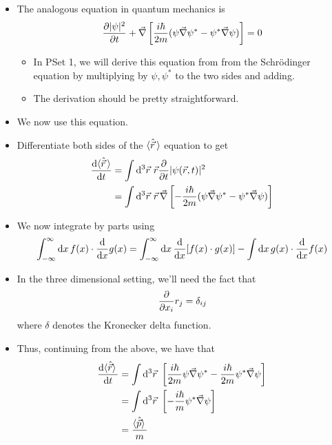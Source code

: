 \documentclass[../notes.tex]{subfiles}
\begin{document}
\begin{itemize}
\begin{itemize}
        \item The analogous equation in quantum mechanics is
        \begin{equation*}
            \pdv{|\psi|^2}{t}+\vec{\nabla}\left[ \frac{i\hbar}{2m}(\psi\vec{\nabla}\psi^*-\psi^*\vec{\nabla}\psi) \right] = 0
        \end{equation*}
        \begin{itemize}
            \item In PSet 1, we will derive this equation from from the Schr\"{o}dinger equation by multiplying by $\psi,\psi^*$ to the two sides and adding.
            \item The derivation should be pretty straightforward.
        \end{itemize}
        \item We now use this equation.
        \item Differentiate both sides of the $\langle{\hat{\vec{r}}\,}\rangle$ equation to get
        \begin{align*}
            \dv{\Exp{\hat{\vec{r}}\,}}{t} &= \int\dd^3\vec{r}\ \vec{r}\pdv{t}|\psi(\vec{r},t)|^2\\
            &= \int\dd^3\vec{r}\ \vec{r}\,\vec{\nabla}\left[ -\frac{i\hbar}{2m}(\psi\vec{\nabla}\psi^*-\psi^*\vec{\nabla}\psi) \right]
        \end{align*}
        \item We now integrate by parts using
        \begin{equation*}
            \int_{-\infty}^\infty\dd{x}f(x)\cdot\dv{x}g(x) = \int_{-\infty}^\infty\dd{x}\dv{x}[f(x)\cdot g(x)]-\int\dd{x}g(x)\cdot\dv{x}f(x)
        \end{equation*}
        \item In the three dimensional setting, we'll need the fact that
        \begin{equation*}
            \pdv{x_i}r_j = \delta_{ij}
        \end{equation*}
        where $\delta$ denotes the Kronecker delta function.
        \item Thus, continuing from the above, we have that
        \begin{align*}
            \dv{\Exp{\hat{\vec{r}}}\,}{t} &= \int\dd^3\vec{r}\ \left[ \frac{i\hbar}{2m}\psi\vec{\nabla}\psi^*-\frac{i\hbar}{2m}\psi^*\vec{\nabla}\psi \right]\\
            &= \int\dd^3\vec{r}\ \left[ -\frac{i\hbar}{m}\psi^*\vec{\nabla}\psi \right]\\
            &= \frac{\Exp{\hat{\vec{p}}}\,}{m}

\end{align*}
\end{itemize}
\end{itemize}
\end{document}
